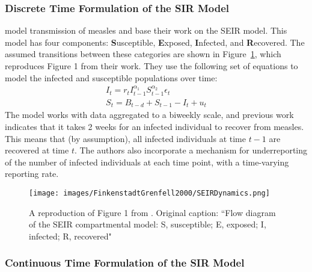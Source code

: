 \documentclass[fleqn]{article}\usepackage[]{graphicx}\usepackage[]{color}
\begin{document}
\subsubsection{Discrete Time Formulation of the SIR Model}
\label{subsubsec:ModelFormulation:SIR:DiscreteTime}


\cite{finkenstadt2000TimeSeriesDiseasesDynamicalSystems} model transmission of measles and base their work on the SEIR model.  This model has four components: \textbf{S}usceptible, \textbf{E}xposed, \textbf{I}nfected, and \textbf{R}ecovered.  The assumed transitions between these categories are shown in Figure~\ref{fig:FinkenstadtGrenfell2000SEIRDynamics}, which reproduces Figure 1 from their work.  They use the following set of equations to model the infected and susceptible populations over time:
\begin{align}
I_t = r_t I_{t - 1}^{\alpha_1} S_{t - 1}^{\alpha_2} \epsilon_t \label{eqn:FinkenstadtGrenfell2000It} \\
S_t = B_{t - d} + S_{t - 1} - I_t + u_t \label{eqn:FinkenstadtGrenfell2000St}
\end{align}
The model works with data aggregated to a biweekly scale, and previous work indicates that it takes 2 weeks for an infected individual to recover from measles.  This means that (by assumption), all infected individuals at time $t - 1$ are recovered at time $t$.  The authors also incorporate a mechanism for underreporting of the number of infected individuals at each time point, with a time-varying reporting rate.


\begin{figure}
\texttt{[image: images/FinkenstadtGrenfell2000/SEIRDynamics.png]} 
\caption{A reproduction of Figure 1 from \cite{finkenstadt2000TimeSeriesDiseasesDynamicalSystems}.  Original caption: ``Flow diagram of the SEIR compartmental model: S, susceptible; E, exposed; I, infected; R, recovered"}
\label{fig:FinkenstadtGrenfell2000SEIRDynamics}
\end{figure}


\subsubsection{Continuous Time Formulation of the SIR Model}
\label{subsubsec:ModelFormulation:SIR:ContinuousTime}
\end{document}
